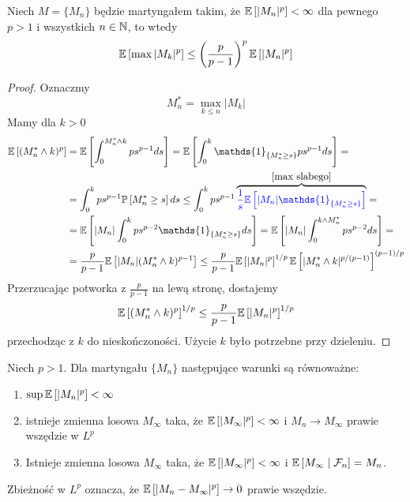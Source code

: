 \begin{theorem}
  Niech $M=\{M_n\}$ będzie martyngałem takim, że $\expected{|M_n|^p}<\infty$ dla pewnego $p>1$ i wszystkich $n\in\operatorname{\mathbb{N}}$, to wtedy
  $$\expected{\max|M_k|^p}\leq\left(\frac{p}{p-1}\right)^p\expected{|M_n|^p}$$
\end{theorem}

\begin{proof}
  Oznaczmy
  $$M_n^*=\max_{k\leq n}|M_k|$$
  Mamy dla $k>0$
  \begin{align*}
    \expected{(M_n^*\land k)^p}&=\expected{\int_0^{M_n^*\land k}ps^{p-1}ds}=\expected{\int_0^k\mathds{1}_{\{M_n^*\geq s\}}ps^{p-1}ds}=\\ 
                               &=\int_0^kps^{p-1}\prob{M_n^*\geq s}ds\leq\int_0^kps^{p-1}\overbrace{\color{blue}\frac{1}{s}\expected{|M_n|\mathds{1}_{\{M_n^*\geq s\}}}}^{\ref{max slabego}}=\\ 
                               &=\expected{|M_n|\int_0^kps^{p-2}\mathds{1}_{\{M_n^*\geq s\}}ds}=\expected{|M_n|\int_0^{k\land M_n^*}ps^{p-2}ds}=\\ 
                               &=\frac{p}{p-1}\expected{|M_n|(M_n^*\land k)^{p-1}}\leq\frac{p}{p-1}\expected{|M_n|^p}^{1/p}\expected{|M_n^*\land k|^{p/(p-1)}}^{(p-1)/p}
  \end{align*}
  Przerzucając potworka z $\frac{p}{p-1}$ na lewą stronę, dostajemy
  $$\expected{(M_n^*\land k)^p}^{1/p}\leq \frac{p}{p-1}\expected{|M_n|^p}^{1/p}$$
  przechodząc z $k$ do nieskończoności. Użycie $k$ było potrzebne przy dzieleniu.
\end{proof}

\begin{theorem}
  Niech $p>1$. Dla martyngału $\{M_n\}$ następujące warunki są równoważne:
  \begin{enumerate}
    \item $\sup \expected{|M_n|^p}<\infty$
    \item istnieje zmienna losowa $M_\infty$ taka, że $\expected{|M_\infty|^p}<\infty$ i $M_n\to M_\infty$ prawie wszędzie w $L^p$
    \item Istnieje zmienna losowa $M_\infty$ taka, że $\expected{|M_\infty|^p}<\infty$ i $\expected{M_\infty}{\set{F}_n}=M_n$.
  \end{enumerate}
\end{theorem}

\begin{dygresja}
  Zbieżność w $L^p$ oznacza, że $\expected{|M_n-M_\infty|^p}\to 0$ prawie wszędzie.
\end{dygresja}


